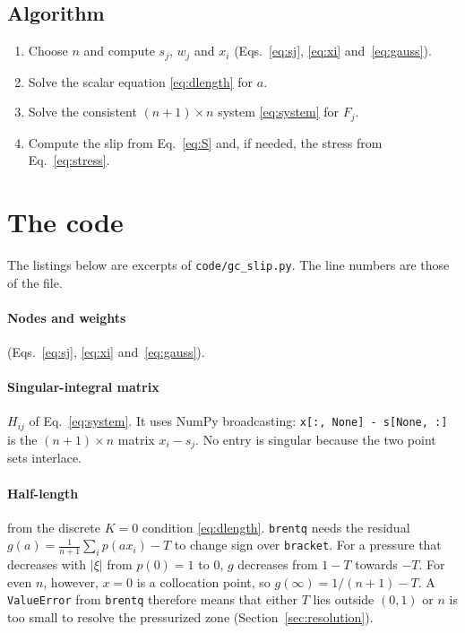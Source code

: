 \documentclass[12pt]{article}
\newcommand{\excerpt}[1]{}
\begin{document}
\subsection{Algorithm}
\begin{enumerate}
	\item Choose $n$ and compute $s_j$, $w_j$ and $x_i$ (Eqs.~\ref{eq:sj}, \ref{eq:xi}
	      and~\ref{eq:gauss}).
	\item Solve the scalar equation \eqref{eq:dlength} for $a$.
	\item Solve the consistent $(n+1)\times n$ system \eqref{eq:system} for $F_j$.
	\item Compute the slip from Eq.~\eqref{eq:S} and, if needed, the stress from
	      Eq.~\eqref{eq:stress}.
\end{enumerate}

\section{The code}\label{sec:code}

The listings below are excerpts of \texttt{code/gc\_slip.py}. The line numbers
are those of the file.

\paragraph{Nodes and weights} (Eqs.~\ref{eq:sj}, \ref{eq:xi} and~\ref{eq:gauss}).
\excerpt{nodes}

\paragraph{Singular-integral matrix} $H_{ij}$ of Eq.~\eqref{eq:system}. It uses
NumPy broadcasting: \texttt{x[:, None] - s[None, :]} is the $(n+1)\times n$
matrix $x_i - s_j$. No entry is singular because the two point sets interlace.
\excerpt{hilbert}

\paragraph{Half-length} from the discrete $K=0$ condition \eqref{eq:dlength}.
\texttt{brentq} needs the residual $g(a) = \frac1{n+1}\sum_i p(ax_i) - T$ to
change sign over \texttt{bracket}. For a pressure that decreases with $|\xi|$
from $p(0)=1$ to $0$, $g$ decreases from $1-T$ towards $-T$. For even $n$,
however, $x=0$ is a collocation point, so $g(\infty) = 1/(n+1) - T$. A
\texttt{ValueError} from \texttt{brentq} therefore means that either $T$ lies
outside $(0,1)$ or $n$ is too small to resolve the pressurized zone
(Section~\ref{sec:resolution}).
\excerpt{crack_length}
\end{document}
